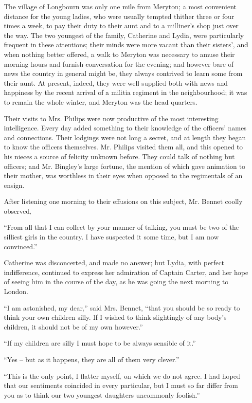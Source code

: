 The village of Longbourn was only one mile from
Meryton; a most convenient distance for the young
ladies, who were usually tempted thither three or four
times a week, to pay their duty to their aunt and to a
milliner’s shop just over the way. The two youngest
of the family, Catherine and Lydia, were particularly
frequent in these attentions; their minds were more
vacant than their sisters’, and when nothing better offered,
a walk to Meryton was necessary to amuse their morning
hours and furnish conversation for the evening; and
however bare of news the country in general might be,
they always contrived to learn some from their aunt.
At present, indeed, they were well supplied both with news
and happiness by the recent arrival of a militia regiment
in the neighbourhood; it was to remain the whole winter,
and Meryton was the head quarters.

Their visits to Mrs. Philips were now productive of
the most interesting intelligence. Every day added
something to their knowledge of the officers’ names and
connections. Their lodgings were not long a secret, and
at length they began to know the officers themselves.
Mr. Philips visited them all, and this opened to his nieces
a source of felicity unknown before. They could talk of
nothing but officers; and Mr. Bingley’s large fortune,
the mention of which gave animation to their mother,
was worthless in their eyes when opposed to the regimentals
of an ensign.

After listening one morning to their effusions on this
subject, Mr. Bennet coolly observed,

“From all that I can collect by your manner of talking,
you must be two of the silliest girls in the country. I have
suspected it some time, but I am now convinced.”

Catherine was disconcerted, and made no answer; but
Lydia, with perfect indifference, continued to express her
admiration of Captain Carter, and her hope of seeing him
in the course of the day, as he was going the next morning
to London.

“I am astonished, my dear,” said Mrs. Bennet, “that
you should be so ready to think your own children silly.
If I wished to think slightingly of any body’s children,
it should not be of my own however.”

“If my children are silly I must hope to be always
sensible of it.”

“Yes -- but as it happens, they are all of them very
clever.”

“This is the only point, I flatter myself, on which we
do not agree. I had hoped that our sentiments coincided
in every particular, but I must so far differ from you
as to think our two youngest daughters uncommonly
foolish.”

